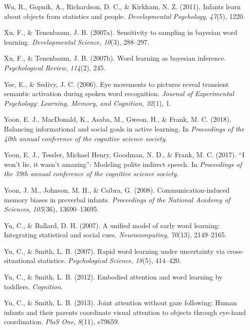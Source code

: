 \documentclass[oneside]{report}
\begin{document}
\hypertarget{ref-wu2011infants}{}
Wu, R., Gopnik, A., Richardson, D. C., \& Kirkham, N. Z. (2011). Infants
learn about objects from statistics and people. \emph{Developmental
Psychology}, \emph{47}(5), 1220.

\hypertarget{ref-xu2007sampling}{}
Xu, F., \& Tenenbaum, J. B. (2007a). Sensitivity to sampling in bayesian
word learning. \emph{Developmental Science}, \emph{10}(3), 288--297.

\hypertarget{ref-xu2007word}{}
Xu, F., \& Tenenbaum, J. B. (2007b). Word learning as bayesian
inference. \emph{Psychological Review}, \emph{114}(2), 245.

\hypertarget{ref-yee2006eye}{}
Yee, E., \& Sedivy, J. C. (2006). Eye movements to pictures reveal
transient semantic activation during spoken word recognition.
\emph{Journal of Experimental Psychology: Learning, Memory, and
Cognition}, \emph{32}(1), 1.

\hypertarget{ref-yoon2018balancing}{}
Yoon, E. J., MacDonald, K., Asaba, M., Gweon, H., \& Frank, M. C.
(2018). Balancing informational and social goals in active learning. In
\emph{Proceedings of the 40th annual conference of the cognitive science
society}.

\hypertarget{ref-yoonwon}{}
Yoon, E. J., Tessler, Michael Henry, Goodman, N. D., \& Frank, M. C.
(2017). ``I won't lie, it wasn't amazing'': Modeling polite indirect
speech. In \emph{Proceedings of the 39th annual conference of the
cognitive science society}.

\hypertarget{ref-yoon2008communication}{}
Yoon, J. M., Johnson, M. H., \& Csibra, G. (2008). Communication-induced
memory biases in preverbal infants. \emph{Proceedings of the National
Academy of Sciences}, \emph{105}(36), 13690--13695.

\hypertarget{ref-yu2007unified}{}
Yu, C., \& Ballard, D. H. (2007). A unified model of early word
learning: Integrating statistical and social cues.
\emph{Neurocomputing}, \emph{70}(13), 2149--2165.

\hypertarget{ref-yu2007rapid}{}
Yu, C., \& Smith, L. B. (2007). Rapid word learning under uncertainty
via cross-situational statistics. \emph{Psychological Science},
\emph{18}(5), 414--420.

\hypertarget{ref-yu2012embodied}{}
Yu, C., \& Smith, L. B. (2012). Embodied attention and word learning by
toddlers. \emph{Cognition}.

\hypertarget{ref-yu2013joint}{}
Yu, C., \& Smith, L. B. (2013). Joint attention without gaze following:
Human infants and their parents coordinate visual attention to objects
through eye-hand coordination. \emph{PloS One}, \emph{8}(11), e79659.
\end{document}
